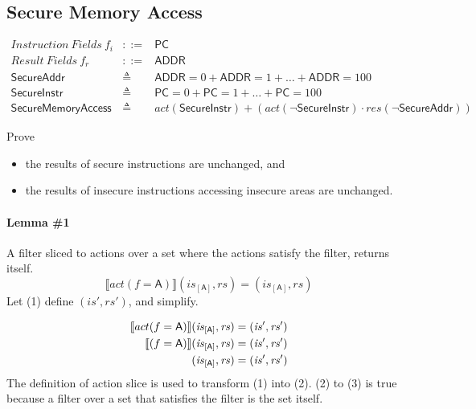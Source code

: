 \documentclass[12pt, letterpaper]{article}
\newcommand\interp[1]{\llbracket #1 \rrbracket}
\begin{document}
\subsection{Secure Memory Access}
 \[
 \begin{array}{rcl}
   \mathit{Instruction\ Fields}\ f_i &::=& \mathsf{PC} \\
   \mathit{Result\ Fields}\ f_r &::=& \mathsf{ADDR} \\
   \mathsf{SecureAddr} &\triangleq& \mathsf{ADDR} = 0 + \mathsf{ADDR} = 1 + \ldots + \mathsf{ADDR} = 100 \\
   \mathsf{SecureInstr} &\triangleq& \mathsf{PC} = 0 + \mathsf{PC} = 1 + \ldots + \mathsf{PC} = 100 \\
   \mathsf{SecureMemoryAccess} &\triangleq&
     \mathit{act}(\mathsf{SecureInstr}) +
     (\mathit{act}(\neg\mathsf{SecureInstr}) \cdot
      \mathit{res}(\neg\mathsf{SecureAddr}))
      
 \end{array}
 \]

 Prove
 \begin{itemize}
     \item the results of secure instructions are unchanged, and
     \item the results of insecure instructions accessing insecure areas are unchanged.
 \end{itemize}

 \paragraph{Lemma \#1}
     A filter sliced to actions over a set where the actions satisfy the filter, returns itself.
 \[
     \interp{ act(f=\mathsf{A}) } (\mathit{is}_{[\mathsf{A}]}, \mathit{rs}) = (\mathit{is_{[\mathsf{A}]}}, \mathit{rs})
 \]
     Let (1) define $(\mathit{is}', \mathit{rs}')$, and simplify.
 \par\nobreak
 {\fontsize{10pt}{12pt}\selectfont
 \begin{align}
     \setcounter{equation}{0}
     \interp{ act(f=\mathsf{A}) } (\mathit{is}_{[\mathsf{A}]}, \mathit{rs})
     &= 
     (\mathit{is}', \mathit{rs}')
     \\
     \interp{ (f=\mathsf{A}) } (\mathit{is}_{[\mathsf{A}]}, \mathit{rs})
     &= 
     (\mathit{is}', \mathit{rs}')
     \\
     (\mathit{is}_{[\mathsf{A}]}, \mathit{rs})
     &= 
     (\mathit{is}', \mathit{rs}')
 \end{align}
 }%
     The definition of action slice is used to transform (1) into (2).  (2) to (3) is true because a filter over a set that satisfies the filter is the set itself.\\
\end{document}
